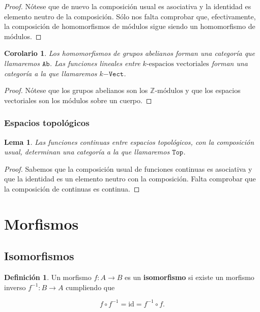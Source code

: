 \documentclass[11pt]{article}
\theoremstyle{plain}
\newtheorem{lemma}{Lema}
\newtheorem{corollary}{Corolario}
\theoremstyle{definition}
\newtheorem{definition}{Definición}
\theoremstyle{remark}
\begin{document}
\begin{proof}
Nótese que de nuevo la composición usual es asociativa y la identidad
es elemento neutro de la composición. Sólo nos falta comprobar que,
efectivamente, la composición de homomorfismos de módulos sigue siendo
un homomorfismo de módulos.
\end{proof}

\begin{corollary}
Los homomorfismos de grupos abelianos forman una categoría que llamaremos
\(\mathtt{Ab}\). Las funciones lineales entre \(k\text{-espacios vectoriales}\) forman una categoría
a la que llamaremos \(k\mathtt{-Vect}\).
\end{corollary}

\begin{proof}
Nótese que los grupos abelianos son los \(\mathbb{Z}\text{-módulos}\) y que los
espacios vectoriales son los módulos sobre un cuerpo.
\end{proof}

\subsubsection{Espacios topológicos}
\label{sec:org1297640}
\begin{lemma}
Las funciones continuas entre espacios topológicos, con la composición
usual, determinan una categoría a la que llamaremos \(\mathtt{Top}\).
\end{lemma}

\begin{proof}
Sabemos que la composición usual de funciones continuas es
asociativa y que la identidad es un elemento neutro con la composición.
Falta comprobar que la composición de continuas es continua.
\end{proof}

\section{Morfismos}
\label{sec:orgf4eb595}
\subsection{Isomorfismos}
\label{sec:org3651552}
\begin{definition}
Un morfismo \(f\colon A \to B\) es un \textbf{isomorfismo} si existe un morfismo inverso
\(f^{-1} \colon B \to A\) cumpliendo que

\[
f \circ f^{-1} = \mathrm{id} = f^{-1} \circ f.
\]
\end{definition}
\end{document}
